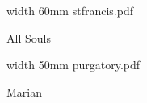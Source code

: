 

\bigskip



\eject



\bigskip

\pdfximage width 60mm {stfrancis.pdf}

\centerline{\pdfrefximage \pdflastximage}



\eject

\beginpart All Souls



\paginaproxima


\bigskip

\pdfximage width 50mm {purgatory.pdf}

\centerline{\pdfrefximage \pdflastximage}



\eject

\beginpart Marian


\bigskip



\paginaproxima

%


%




\bigskip




\eject


\paginaproxima



\paginaproxima


\paginaproxima


\paginaproxima


